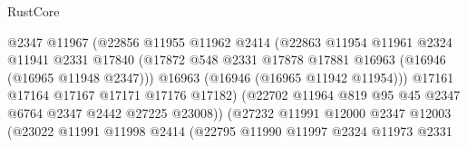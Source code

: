 \begin{lexlean}{RustCore}
\begin{coremodule}
                                      @2347
                                      @11967
                                      (@22856
                                        @11955
                                        @11962
                                        @2414
                                        (@22863
                                          @11954
                                          @11961
                                          @2324
                                          @11941
                                          @2331
                                          @17840
                                          (@17872
                                            @548
                                            @2331
                                            @17878
                                            @17881
                                            @16963
                                            (@16946 (@16965 @11948 @2347)))
                                          @16963
                                          (@16946 (@16965 @11942 @11954)))
                                        @17161
                                        @17164
                                        @17167
                                        @17171
                                        @17176
                                        @17182)
                                      (@22702
                                        @11964
                                        @819
                                        @95
                                        @45
                                        @2347
                                        @6764
                                        @2347
                                        @2442
                                        @27225
                                        @23008))
                                    (@27232
                                      @11991
                                      @12000
                                      @2347
                                      @12003
                                      (@23022
                                        @11991
                                        @11998
                                        @2414
                                        (@22795
                                          @11990
                                          @11997
                                          @2324
                                          @11973
                                          @2331

\end{coremodule}
\end{lexlean}
